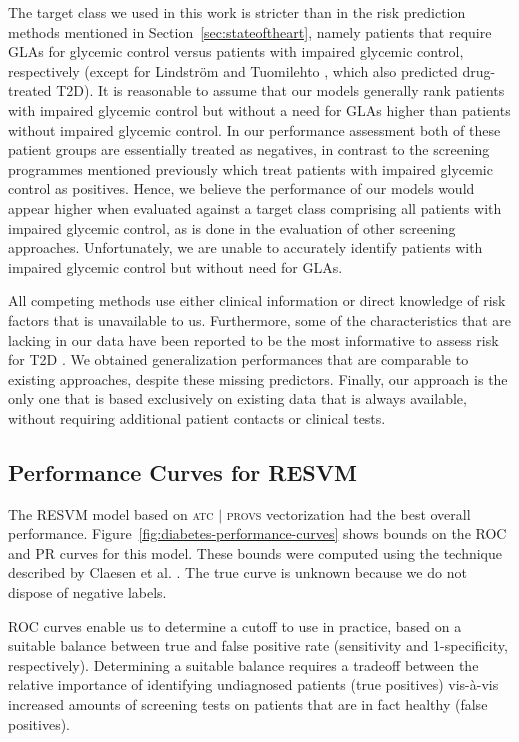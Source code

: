 The target class we used in this work is stricter than in the risk prediction methods mentioned in Section~\ref{sec:stateoftheart}, namely patients that require GLAs for glycemic control versus patients with impaired glycemic control, respectively (except for Lindstr{\"o}m and Tuomilehto \citep{lindstrom2003diabetes}, which also predicted drug-treated T2D). It is reasonable to assume that our models generally rank patients with impaired glycemic control but without a need for GLAs higher than patients without impaired glycemic control. In our performance assessment both of these patient groups are essentially treated as negatives, in contrast to the screening programmes mentioned previously which treat patients with impaired glycemic control as positives. Hence, we believe the performance of our models would appear higher when evaluated against a target class comprising all patients with impaired glycemic control, as is done in the evaluation of other screening approaches. Unfortunately, we are unable to accurately identify patients with impaired glycemic control but without need for GLAs.

All competing methods use either clinical information or direct knowledge of risk factors that is unavailable to us. Furthermore, some of the characteristics that are lacking in our data have been reported to be the most informative to assess risk for T2D \citep{lindstrom2003diabetes,stern2002identification, mcneely2003comparison}. We obtained generalization performances that are comparable to existing approaches, despite these missing predictors. Finally, our approach is the only one that is based exclusively on existing data that is always available, without requiring additional patient contacts or clinical tests.


\subsection{Performance Curves for RESVM} \label{resvmroc}
The RESVM model based on \textsc{atc $|$ provs} vectorization had the best overall performance. Figure~\ref{fig:diabetes-performance-curves} shows bounds on the ROC and PR curves for this model. These bounds were computed using the technique described by Claesen et al. \citep{claesen2015icml}. The true curve is unknown because we do not dispose of negative labels.

ROC curves enable us to determine a cutoff to use in practice, based on a suitable balance between true and false positive rate (sensitivity and 1-specificity, respectively). Determining a suitable balance requires a tradeoff between the relative importance of identifying undiagnosed patients (true positives) vis-\`a-vis increased amounts of screening tests on patients that are in fact healthy (false positives).

